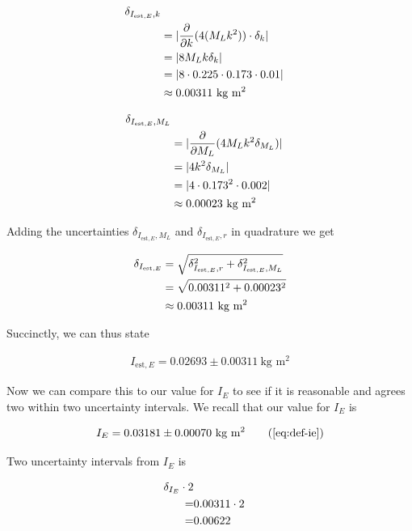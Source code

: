 \documentclass[coverpage]{article}
\newcommand{\iUnit}{\text{kg $\text{m}^2$}}
\begin{document}
	\begin{align}
		\delta_{I_{\text{est}, E}, k} \notag \\
		&= |\frac{\partial}{\partial k} (4 (M_L k^2)) \cdot \delta_k| \notag \\
		&= |8 M_L k \delta_k| \notag \\
		&= |8 \cdot 0.225 \cdot 0.173 \cdot 0.01| \notag \\
		&\approx 0.00311\ \iUnit
	\end{align}
	
	\begin{align}
		\delta_{I_{\text{est}, E}, M_L} \notag \\
		&= |\frac{\partial}{\partial M_L} (4 M_L k^2 \delta_{M_L})| \notag \\
		&= |4 k^2 \delta_{M_L}| \notag \\
		&= |4 \cdot 0.173^2 \cdot 0.002| \notag \\
		&\approx 0.00023\ \iUnit
	\end{align}
	
	Adding the uncertainties $\delta_{I_{\text{est}, E}, M_L}$ and $\delta_{I_{\text{est}, E}, r}$ in quadrature we get
	
	\begin{align}
		\delta_{I_{\text{est}, E}} &= \sqrt{\delta_{I_{\text{est}, E}, r}^2 + \delta_{I_{\text{est}, E}, M_L}^2} \notag \\
		&= \sqrt{0.00311^2 + 0.00023^2} \notag \\
		&\approx 0.00311\ \iUnit
	\end{align}

	Succinctly, we can thus state
	
	\begin{align}
		I_{\text{est}, E} = 0.02693 \pm 0.00311\ \iUnit
	\end{align}

	Now we can compare this to our value for $I_E$ to see if it is reasonable and agrees two within two uncertainty intervals. We recall that our value for $I_E$ is
	
	\begin{align}
		I_E = 0.03181 \pm 0.00070\ \iUnit \tag{\ref{eq:def-ie}}
	\end{align} 

	Two uncertainty intervals from $I_E$ is
	
	\begin{align}
		\delta_{I_E} \cdot 2 \notag \\
		=& 0.00311 \cdot 2 \notag \\
		=& 0.00622
	\end{align}
\end{document}
